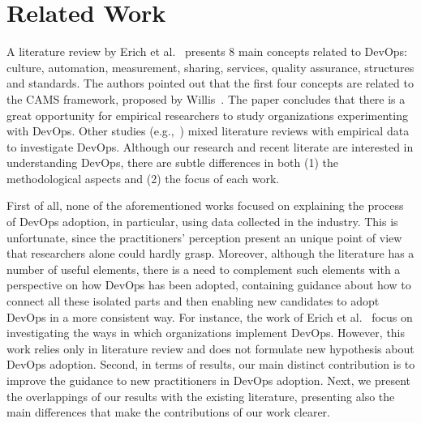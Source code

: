 \section{Related Work} \label{sec:related_work}

A literature review by Erich et al.~\cite{cooperation_dev_ops_esem_2014} presents 8
main concepts related to DevOps: culture, automation, measurement, sharing,
services, quality assurance, structures and standards. The authors pointed out
that the first four concepts are
related to the CAMS framework, proposed by Willis~\cite{what_devops_means_2010}.
The paper concludes that there is a great opportunity for empirical researchers
to study organizations experimenting with DevOps.
Other studies (e.g.,~\cite{devops_a_definition_xp_15,dimensions_of_devops_xp_15,extending_dimensions_icsea_16,characterizing_devops_sbes_2016,qualitative_devops_journalsw_17})
mixed literature reviews with empirical data to investigate DevOps.
Although our research and recent literate are interested in understanding DevOps,
there are subtle differences in both (1) the methodological aspects and (2) the focus
of each work.

First of all, none of the aforementioned works focused on explaining the process of DevOps adoption,
in particular, using data collected in the industry. This is unfortunate, since the
practitioners' perception present an unique point of view that researchers
alone could hardly grasp. Moreover, although the literature has a number of
useful elements, there is a need to complement such elements with a perspective on how DevOps has
been adopted, containing guidance about how to connect all these isolated parts
and then enabling new candidates to adopt DevOps in a more consistent way.
For instance, the work of Erich et al.~\cite{qualitative_devops_journalsw_17}
focus on investigating the ways in which organizations implement DevOps.
However, this work relies only in literature review and does not formulate
new hypothesis about DevOps adoption. Second,
in terms of results, our main distinct contribution is to improve the guidance
to new practitioners in DevOps adoption.
Next, we present the overlappings of our
results with the existing literature, presenting also the main differences that
make the contributions of our work clearer.

